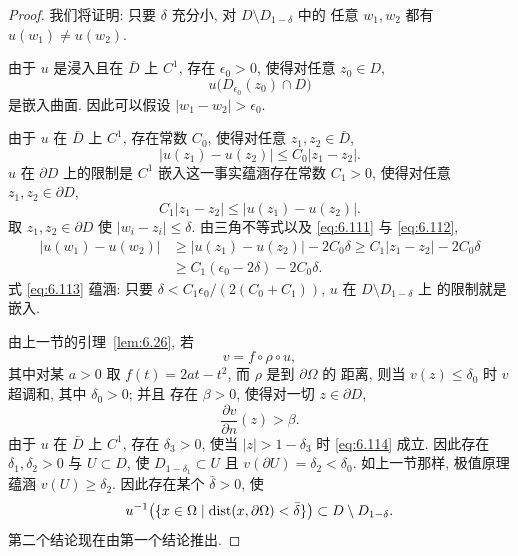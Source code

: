 \begin{proof}
我们将证明: 只要 $\delta$ 充分小, 对 $D\setminus D_{1-\delta}$ 中的
任意 $w_1,w_2$ 都有 $u(w_1)\neq u(w_2)$.

由于 $u$ 是浸入且在 $\bar{D}$ 上 $C^1$, 存在 $\epsilon_0>0$, 使得对任意
$z_0\in D$,
\begin{equation}
u\bigl(D_{\epsilon_0}(z_0)\cap D\bigr)
\label{eq:6.110}
\end{equation}
是嵌入曲面. 因此可以假设 $|w_1-w_2|>\epsilon_0$.

由于 $u$ 在 $\bar{D}$ 上 $C^1$, 存在常数 $C_0$, 使得对任意
$z_1,z_2\in\bar{D}$,
\begin{equation}
\bigl|u(z_1)-u(z_2)\bigr|\leq C_0|z_1-z_2|.
\label{eq:6.111}
\end{equation}
$u$ 在 $\partial D$ 上的限制是 $C^1$ 嵌入这一事实蕴涵存在常数 $C_1>0$,
使得对任意 $z_1,z_2\in\partial D$,
\begin{equation}
C_1|z_1-z_2|\leq\bigl|u(z_1)-u(z_2)\bigr|.
\label{eq:6.112}
\end{equation}
取 $z_1,z_2\in\partial D$ 使 $|w_i-z_i|\leq\delta$. 由三角不等式以及
\eqref{eq:6.111} 与 \eqref{eq:6.112},
\begin{equation}
\begin{aligned}
|u(w_1)-u(w_2)|&\geq|u(z_1)-u(z_2)|-2C_0\delta
\geq C_1|z_1-z_2|-2C_0\delta\\
&\geq C_1(\epsilon_0-2\delta)-2C_0\delta.
\end{aligned}
\label{eq:6.113}
\end{equation}
式 \eqref{eq:6.113} 蕴涵: 只要
$\delta<C_1\epsilon_0/(2(C_0+C_1))$, $u$ 在 $D\setminus D_{1-\delta}$ 上
的限制就是嵌入.

由上一节的引理~\ref{lem:6.26}, 若
\begin{equation*}
v=f\circ\rho\circ u,
\end{equation*}
其中对某 $a>0$ 取 $f(t)=2at-t^2$, 而 $\rho$ 是到 $\partial\Omega$ 的
距离, 则当 $v(z)\leq\delta_0$ 时 $v$ 超调和, 其中 $\delta_0>0$; 并且
存在 $\beta>0$, 使得对一切 $z\in\partial D$,
\begin{equation}
\frac{\partial v}{\partial n}(z)>\beta.
\label{eq:6.114}
\end{equation}
由于 $u$ 在 $\bar{D}$ 上 $C^1$, 存在 $\delta_3>0$, 使当
$|z|>1-\delta_3$ 时 \eqref{eq:6.114} 成立. 因此存在
$\delta_1,\delta_2>0$ 与 $U\subset D$, 使 $D_{1-\delta_1}\subset U$ 且
$v(\partial U)=\delta_2<\delta_0$. 如上一节那样, 极值原理蕴涵
$v(U)\geq\delta_2$. 因此存在某个 $\bar{\delta}>0$, 使
\begin{equation}
u^{-1}\bigl(\{x\in\Omega\mid\operatorname{dist}(x,\partial\Omega)<\bar{\delta}\}\bigr)
\subset D\setminus D_{1-\delta}.
\label{eq:6.115}
\end{equation}
第二个结论现在由第一个结论推出.
\end{proof}

